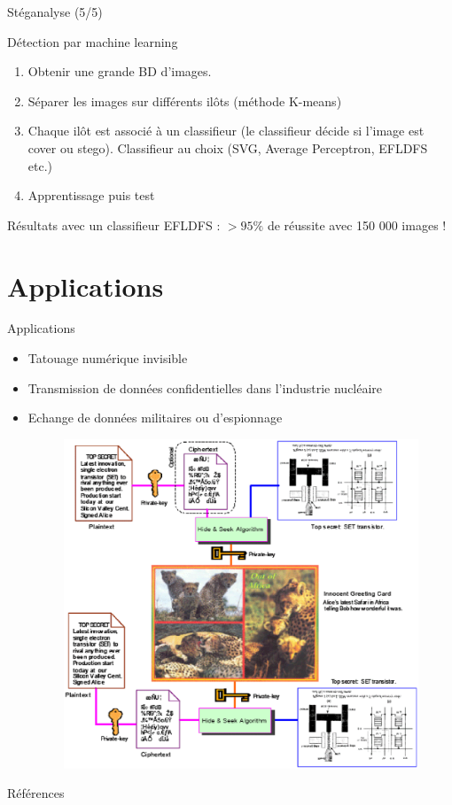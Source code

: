 \documentclass{beamer}
\newif\ifplacelogo
\begin{document}
	\begin{frame}{Stéganalyse (5/5)}
		\begin{exampleblock}{Détection par machine learning}
			\begin{enumerate}
				\item Obtenir une grande BD d'images.
				\item Séparer les images sur différents ilôts (méthode K-means)
				\item Chaque ilôt est associé à un classifieur (le classifieur décide si l'image est cover ou stego). Classifieur au choix (SVG, Average Perceptron, EFLDFS etc.)
				\item Apprentissage puis test
			\end{enumerate}
		Résultats avec un classifieur EFLDFS : $>95 \%$ de réussite avec 150 000 images !
		\end{exampleblock}
	\end{frame}



	\section{Applications}
	
	\begin{frame}{Applications}
		\begin{itemize}
			\item Tatouage numérique invisible
			\item Transmission de données confidentielles dans l'industrie nucléaire
			\item Echange de données militaires ou d'espionnage
			\begin{figure}[h]
				\centering \includegraphics[scale=.25]{images/appli.eps}
			\end{figure}
		\end{itemize}
	\end{frame}
	
	
	\placelogotrue

	
	
	\begin{frame}[allowframebreaks]{Références}
		\footnotesize
		
		
	\end{frame}
\end{document}
